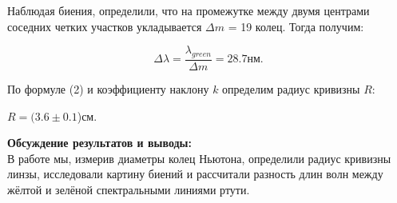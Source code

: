\documentclass[a4paper, 12pt]{article}%
\begin{document}
Наблюдая биения, определили, что на промежутке между двумя центрами соседних четких участков укладывается $\Delta m$ = 19 колец. Тогда получим:

\begin{equation}
	\Delta\lambda = \frac{\lambda_{green}}{\Delta m} = 28.7 \text{нм}.
\end{equation} 

По формуле (2) и коэффициенту наклону $k$ определим радиус кривизны $R$:

$R = (3.6 \pm 0.1$)см.

	\textbf{Обсуждение результатов и выводы: }\\
В работе мы, измерив диаметры колец Ньютона, определили радиус кривизны линзы, исследовали картину биений и рассчитали
разность длин волн между жёлтой и зелёной спектральными линиями
ртути.
\end{document}
